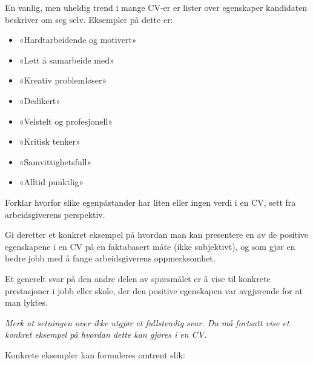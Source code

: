 

En vanlig, men uheldig trend i mange CV-er er lister over egenskaper kandidaten beskriver om seg selv. Eksempler på dette er:

\begin{itemize}
\item{} «Hardtarbeidende og motivert»
\item{} «Lett å samarbeide med»
\item{} «Kreativ problemløser»
\item{} «Dedikert»
\item{} «Velstelt og profesjonell»
\item{} «Kritisk tenker»
\item{} «Samvittighetsfull»
\item{} «Alltid punktlig»
\end{itemize}

Forklar hvorfor slike egenpåstander har liten eller ingen verdi i en CV, sett fra arbeidsgiverens perspektiv.

\vskip 50pt

Gi deretter et konkret eksempel på hvordan man kan presentere en av de positive egenskapene i en CV på en faktabasert måte (ikke subjektivt), og som gjør en bedre jobb med å fange arbeidsgiverens oppmerksomhet.

\vskip 50pt







Et generelt svar på den andre delen av spørsmålet er å vise til konkrete prestasjoner i jobb eller skole, der den positive egenskapen var avgjørende for at man lyktes.

\vskip 10pt

{\it Merk at setningen over ikke utgjør et fullstendig svar. Du må fortsatt vise et konkret eksempel på hvordan dette kan gjøres i en CV.}







Konkrete eksempler kan formuleres omtrent slik:

